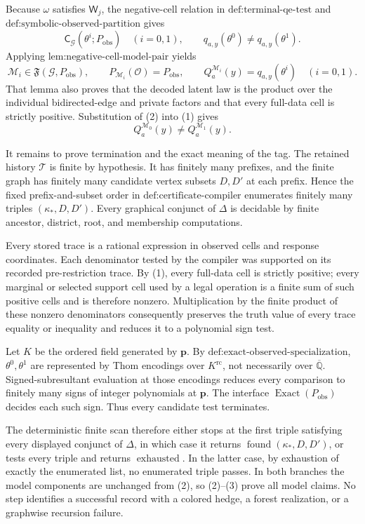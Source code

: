 Because \(\omega\) satisfies \(\mathsf W_j\), the negative-cell relation in \(\text{def:terminal-qe-test}\) and \(\text{def:symbolic-observed-partition}\) gives
\[
\mathsf C_{\mathcal G}(\theta^i;P_{\mathrm{obs}})\quad(i=0,1),
\qquad
q_{a,y}(\theta^0)\neq q_{a,y}(\theta^1).
\tag{1}
\]
Applying \(\text{lem:negative-cell-model-pair}\) yields
\[
\mathcal M_i\in\mathfrak F(\mathcal G,P_{\mathrm{obs}}),
\qquad
P_{\mathcal M_i}(\mathcal O)=P_{\mathrm{obs}},
\qquad
Q_a^{\mathcal M_i}(y)=q_{a,y}(\theta^i)
\quad(i=0,1).
\tag{2}
\]
That lemma also proves that the decoded latent law is the product over the individual bidirected-edge and private factors and that every full-data cell is strictly positive. Substitution of (2) into (1) gives
\[
Q_a^{\mathcal M_0}(y)\neq Q_a^{\mathcal M_1}(y).
\tag{3}
\]

It remains to prove termination and the exact meaning of the tag. The retained history \(\mathcal T\) is finite by hypothesis. It has finitely many prefixes, and the finite graph has finitely many candidate vertex subsets \(D,D'\) at each prefix. Hence the fixed prefix-and-subset order in \(\text{def:certificate-compiler}\) enumerates finitely many triples \((\kappa_*,D,D')\). Every graphical conjunct of \(\Delta\) is decidable by finite ancestor, district, root, and membership computations.

Every stored trace is a rational expression in observed cells and response coordinates. Each denominator tested by the compiler was supported on its recorded pre-restriction trace. By (1), every full-data cell is strictly positive; every marginal or selected support cell used by a legal operation is a finite sum of such positive cells and is therefore nonzero. Multiplication by the finite product of these nonzero denominators consequently preserves the truth value of every trace equality or inequality and reduces it to a polynomial sign test.

Let \(K\) be the ordered field generated by \(\mathbf p\). By \(\text{def:exact-observed-specialization}\), \(\theta^0,\theta^1\) are represented by Thom encodings over \(K^{\mathrm{rc}}\), not necessarily over \(\overline{\mathbb Q}\). Signed-subresultant evaluation at those encodings reduces every comparison to finitely many signs of integer polynomials at \(\mathbf p\). The interface \(\operatorname{Exact}(P_{\mathrm{obs}})\) decides each such sign. Thus every candidate test terminates.

The deterministic finite scan therefore either stops at the first triple satisfying every displayed conjunct of \(\Delta\), in which case it returns \(\operatorname{found}(\kappa_*,D,D')\), or tests every triple and returns \(\operatorname{exhausted}\). In the latter case, by exhaustion of exactly the enumerated list, no enumerated triple passes. In both branches the model components are unchanged from (2), so (2)--(3) prove all model claims. No step identifies a successful record with a colored hedge, a forest realization, or a graphwise recursion failure.